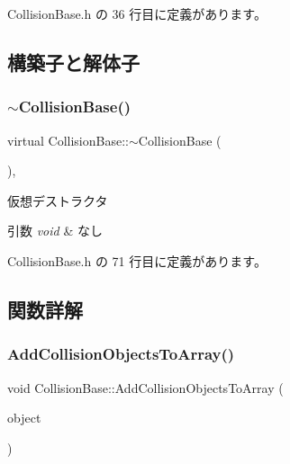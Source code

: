  Collision\+Base.\+h の 36 行目に定義があります。



\subsection{構築子と解体子}
\mbox{\label{class_collision_base_a095def3600633e2eb492bf24112e9dc3}} 
\subsubsection{\texorpdfstring{$\sim$\+Collision\+Base()}{~CollisionBase()}}
{\footnotesize\ttfamily virtual Collision\+Base\+::$\sim$\+Collision\+Base (\begin{DoxyParamCaption}{ }\end{DoxyParamCaption})\hspace{0.3cm}{\ttfamily [inline]}, {\ttfamily [virtual]}}



仮想デストラクタ 


\begin{DoxyParams}{引数}
{\em void} & なし \\
\hline
\end{DoxyParams}


 Collision\+Base.\+h の 71 行目に定義があります。



\subsection{関数詳解}
\mbox{\label{class_collision_base_ace98d75317a9f56bc6cada7980285b53}} 
\subsubsection{\texorpdfstring{Add\+Collision\+Objects\+To\+Array()}{AddCollisionObjectsToArray()}}
{\footnotesize\ttfamily void Collision\+Base\+::\+Add\+Collision\+Objects\+To\+Array (\begin{DoxyParamCaption}\item[{\mbox{\hyperlink{class_collision_objects}{Collision\+Objects}} $\ast$}]{object }\end{DoxyParamCaption})\hspace{0.3cm}{\ttfamily [inline]}}



